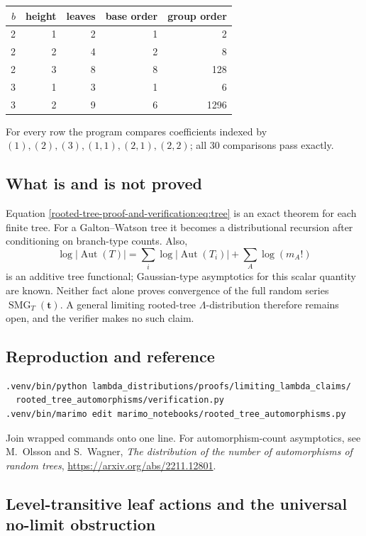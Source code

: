 \documentclass[10pt]{article}
\newcommand{\SMG}{\operatorname{SMG}}
\newcommand{\MGF}{\SMG}
\begin{document}
\begin{center}
\begin{tabular}{@{}rrrrr@{}}\toprule
$b$&height&leaves&base order&group order\\\midrule
2&1&2&1&2\\
2&2&4&2&8\\
2&3&8&8&128\\
3&1&3&1&6\\
3&2&9&6&1296\\\bottomrule
\end{tabular}
\end{center}
For every row the program compares coefficients indexed by
$(1),(2),(3),(1,1),(2,1),(2,2)$; all 30 comparisons pass exactly.

\subsection{What is and is not proved}
Equation \eqref{rooted-tree-proof-and-verification:eq:tree} is an exact theorem for each finite tree.  For a
Galton--Watson tree it becomes a distributional recursion after conditioning
on branch-type counts.  Also,
\[
\log|\operatorname{Aut}(T)|=\sum_i\log|\operatorname{Aut}(T_i)|
+\sum_A\log(m_A!)
\]
is an additive tree functional; Gaussian-type asymptotics for this scalar
quantity are known.  Neither fact alone proves convergence of the full random
series $\MGF_T(\mathbf t)$.  A general limiting rooted-tree
$\Lambda$-distribution therefore remains open, and the verifier makes no such
claim.

\subsection{Reproduction and reference}
\begin{verbatim}
.venv/bin/python lambda_distributions/proofs/limiting_lambda_claims/
  rooted_tree_automorphisms/verification.py
.venv/bin/marimo edit marimo_notebooks/rooted_tree_automorphisms.py
\end{verbatim}
Join wrapped commands onto one line.  For automorphism-count asymptotics, see
M.~Olsson and S.~Wagner, \emph{The distribution of the number of
automorphisms of random trees},
\url{https://arxiv.org/abs/2211.12801}.
\endgroup

\clearpage

\subsection{Level-transitive leaf actions and the universal no-limit obstruction}
\end{document}

